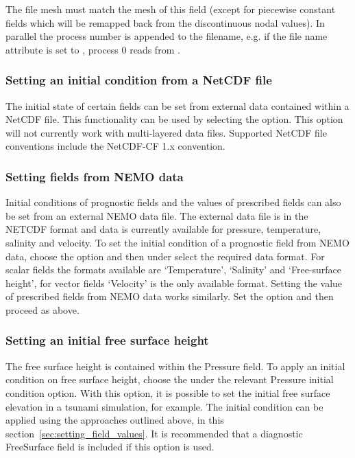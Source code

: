 The file mesh must match the mesh of this field (except for piecewise constant
fields which will be remapped back from the discontinuous nodal values). In
parallel the process number is appended to the filename, e.g. if the file name
attribute is set to , process 0 reads from .

\subsubsection{Setting an initial condition from a NetCDF file}\label{sec:setting_from_netcdf}

The initial state of certain fields can be set from external data contained within a NetCDF file.
This functionality can be used by selecting the 
option.
This option will not currently work with multi-layered data files. Supported
NetCDF file conventions include the NetCDF-CF 1.x convention.

\subsubsection{Setting fields from NEMO data}\label{sec:setting_from_nemo}
Initial conditions of prognostic fields and the values of prescribed fields can also be set from an external NEMO
data file. The external data file is in the NETCDF format and data is currently available for pressure, temperature, salinity
and velocity. To set the initial condition of a prognostic field from NEMO data, choose the option
 and then under  select the required data format. For scalar fields
the formats available are `Temperature', `Salinity' and `Free-surface height', for vector fields `Velocity' is the only available format.
Setting the value of prescribed fields from NEMO data works similarly. Set the option  and then proceed as above.

\subsubsection{Setting an initial free surface height}\label{sec:setting_free_surface_height}
The free surface height is contained within the Pressure field.  To apply an initial condition on free surface height,
choose the  under the relevant Pressure initial condition option.
With this option, it is possible to set the initial free surface elevation in a tsunami simulation, for example.
The initial condition can be applied using the approaches outlined above, in this section~\ref{sec:setting_field_values}.
It is recommended that a diagnostic FreeSurface field is included if this option is used.


